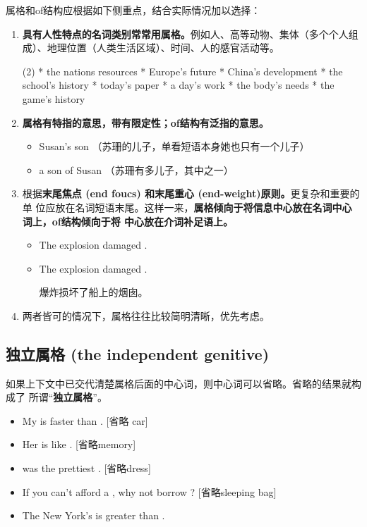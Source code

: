 属格和of结构应根据如下侧重点，结合实际情况加以选择：
\begin{enumerate}
\item \textbf{具有人性特点的名词类别常常用属格。}例如人、高等动物、集体（多个个人组
  成）、地理位置（人类生活区域）、时间、人的感官活动等。
  \begin{taskitem}(2)
    * the nations resources
    * Europe's future
    * China's development
    * the school's history
    * today's paper
    * a day's work
    * the body's needs
    * the game's history
  \end{taskitem}

\item \textbf{属格有特指的意思，带有限定性；of结构有泛指的意思。}
  \begin{itemize}
  \item Susan's son （苏珊的儿子，单看短语本身她也只有一个儿子）

  \item a son of Susan （苏珊有多儿子，其中之一）
  \end{itemize}

\item 根据\textbf{末尾焦点 (end foucs) 和末尾重心 (end-weight)原则。}更复杂和重要的单
  位应放在名词短语末尾。这样一来，\textbf{属格倾向于将信息中心放在名词中心词上，of结构倾向于将
    中心放在介词补足语上。}

  \begin{itemize}
  \item The explosion damaged .
  \item The explosion damaged .

    爆炸损坏了船上的烟囱。
  \end{itemize}

\item 两者皆可的情况下，属格往往比较简明清晰，优先考虑。
\end{enumerate}


\subsection{独立属格 (the independent genitive)}

如果上下文中已交代清楚属格后面的中心词，则中心词可以省略。省略的结果就构成了
所谓“\textbf{独立属格}”。
\begin{itemize}
\item  My  is faster than .  [省略 car]
\item  Her  is like . [省略memory]
\item {} was the prettiest . [省略dress]
\item If you can't afford a , why not borrow ? [省略sleeping bag]
\item The New York's  is greater than .
\end{itemize}


